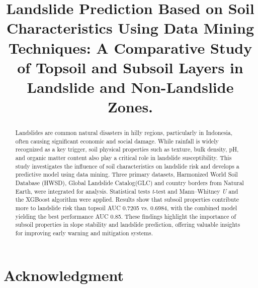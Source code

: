\documentclass[conference]{IEEEtran}
\begin{document}
\title{Landslide Prediction Based on Soil Characteristics Using Data Mining Techniques: A Comparative Study of Topsoil and Subsoil Layers in Landslide and Non-Landslide Zones.}

\author{
}


\maketitle

\begin{abstract}
Landslides are common natural disasters in hilly regions, particularly in Indonesia, often causing significant economic and social damage. While rainfall is widely recognized as a key trigger, soil physical properties such as texture, bulk density, pH, and organic matter content also play a critical role in landslide susceptibility. This study investigates the influence of soil characteristics on landslide risk and develops a predictive model using data mining. Three primary datasets, Harmonized World Soil Database (HWSD), Global Landslide Catalog(GLC) and country borders from Natural Earth, were integrated for analysis. Statistical tests \textit{t}-test and Mann–Whitney \textit{U} and the XGBoost algorithm were applied. Results show that subsoil properties contribute more to landslide risk than topsoil AUC 0.7205 vs. 0.6984, with the combined model yielding the best performance AUC 0.85. These findings highlight the importance of subsoil properties in slope stability and landslide prediction, offering valuable insights for improving early warning and mitigation systems.
\end{abstract}








\section*{Acknowledgment}
\end{document}
